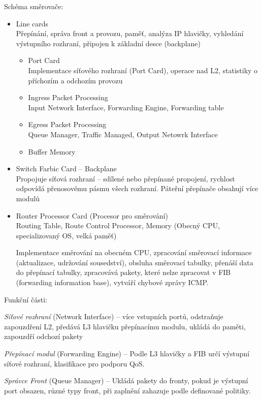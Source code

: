 \documentclass[a4paper, 11pt]{report}
\begin{document}
Schéma směrovače:
\begin{itemize}
	\item Line cards\\
	Přepínání, správa front a provozu, paměť, analýza IP hlavičky, vyhledání výstupního rozhraní, připojen k základní desce (backplane)
	\begin{itemize}
		\item Port Card\\
		Implementace síťového rozhraní (Port Card), operace nad L2, statistiky o příchozím a odchozím provozu
		\item Ingress Packet Processing\\
		Input Network Interface, Forwarding Engine, Forwarding table
		\item Egress Packet Processing\\
		Queue Manager, Traffic Managed, Output Netowrk Interface
		\item Buffer Memory
	\end{itemize}
	\item Switch Farbic Card -- Backplane\\
	Propojuje síťová rozhraní -- sdílené nebo přepínané propojení, rychlost odpovídá přenosovému pásmu všech rozhraní. Páteřní přepínače obsahují více modulů
	\item Router Processor Card (Procesor pro směrování)\\
	Routing Table, Route Control Processor, Memory (Obecný CPU, specializovaný OS, velká paměť)
	
	Implementace směrování na obecném CPU, zpracování směrovací informace (aktualizace, udržování sousedství), obsluha směrovací tabulky, přenáší data do přepínací tabulky, zpracovává pakety, které nelze zpracovat v FIB (forwarding information base), vytváří chybové zprávy ICMP.
\end{itemize}

Funkční části:

\emph{Síťové rozhraní} (Network Interface) -- více vstupních portů, odstraňuje zapouzdření L2, předává L3 hlavičku přepínacímu modulu, ukládá do paměti, zapouzdří odchozí pakety

\emph{Přepínací modul} (Forwarding Engine) -- Podle L3 hlavičky a FIB určí výstupní síťové rozhraní, klasifikace pro podporu QoS.

\emph{Správce Front} (Queue Manager) -- Ukládá pakety do fronty, pokud je výstupní port obsazen, různé typy front, při zaplnění zahazuje podle definované politiky.
\end{document}
